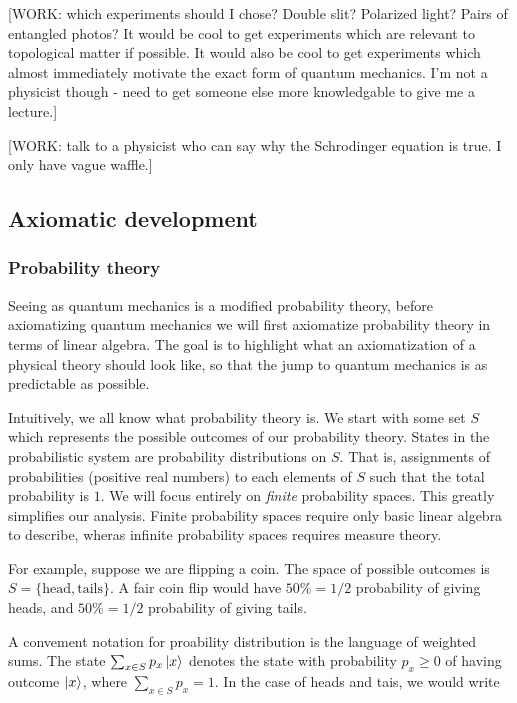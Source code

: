 [WORK: which experiments should I chose? Double slit? Polarized light? Pairs of entangled photos? It would be cool to get experiments which are relevant to topological matter if possible. It would also be cool to get experiments which almost immediately motivate the exact form of quantum mechanics. I'm not a physicist though - need to get someone else more knowledgable to give me a lecture.]

[WORK: talk to a physicist who can say why the Schrodinger equation is true. I only have vague waffle.]

\subsection{Axiomatic development}

\subsubsection{Probability theory}

Seeing as quantum mechanics is a modified probability theory, before axiomatizing quantum mechanics we will first axiomatize probability theory in terms of linear algebra. The goal is to highlight what an axiomatization of a physical theory should look like, so that the jump to quantum mechanics is as predictable as possible.

Intuitively, we all know what probability theory is. We start with some set $S$ which represents the possible outcomes of our probability theory. States in the probabilistic system are probability distributions on $S$. That is, assignments of probabilities (positive real numbers) to each elements of $S$ such that the total probability is $1$. We will focus entirely on \textit{finite} probability spaces. This greatly simplifies our analysis. Finite probability spaces require only basic linear algebra to describe, wheras infinite probability spaces requires measure theory.

For example, suppose we are flipping a coin. The space of possible outcomes is $S=\{\text{head},\text{tails}\}$. A fair coin flip would have $50\%=1/2$ probability of giving heads, and $50\%=1/2$ probability of giving tails.

A convement notation for proability distribution is the language of weighted sums. The state $\sum_{x\in S}p_x\ket{x}$ denotes the state with probability $p_x\geq 0$ of having outcome $\ket{x}$, where $\sum_{x\in S}p_x=1$. In the case of heads and tais, we would write

